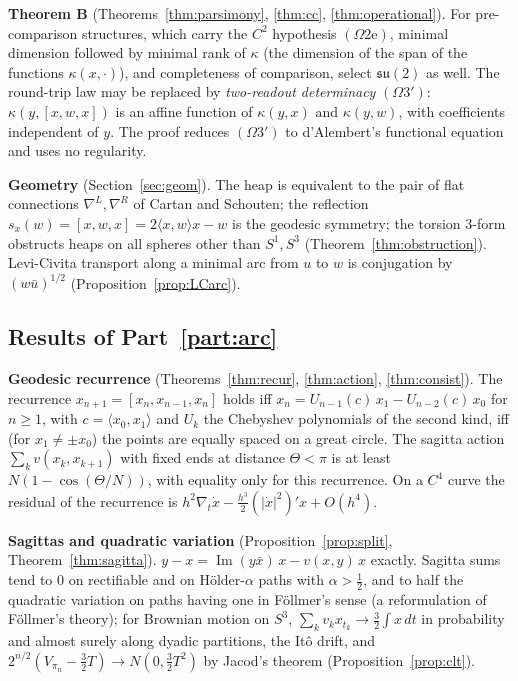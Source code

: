 \documentclass[11pt,reqno]{amsart}
\theoremstyle{definition}
\theoremstyle{remark}
\numberwithin{equation}{section}
\newcommand{\su}{\mathfrak{su}}
\newcommand{\im}{\operatorname{Im}}
\newcommand{\ip}[2]{\langle #1,#2\rangle}
\newcommand{\hp}[3]{[#1,#2,#3]}
\begin{document}
\noindent\textbf{Theorem B} (Theorems~\ref{thm:parsimony}, \ref{thm:cc}, \ref{thm:operational}).  For pre-comparison
structures, which carry the $C^2$ hypothesis $(\Omega2\mathrm e)$, minimal dimension followed by minimal rank of $\kappa$ (the
dimension of the span of the functions $\kappa(x,\cdot)$), and completeness of comparison, select $\su(2)$ as well.  The round-trip law may be
replaced by \emph{two-readout determinacy} $(\Omega3')$: $\kappa(y,\hp xwx)$ is an affine function of $\kappa(y,x)$ and
$\kappa(y,w)$, with coefficients independent of $y$.  The proof reduces $(\Omega3')$ to d'Alembert's functional equation and uses no regularity.

\noindent\textbf{Geometry} (Section~\ref{sec:geom}).  The heap is equivalent to the pair of flat
connections $\nabla^L,\nabla^R$ of Cartan and Schouten; the reflection $s_x(w)=\hp xwx=2\ip xwx-w$ is the
geodesic symmetry; the torsion $3$-form obstructs heaps on all spheres other than $S^1,S^3$
(Theorem~\ref{thm:obstruction}).  Levi-Civita transport along a minimal arc from $u$ to $w$ is conjugation
by $(w\bar u)^{1/2}$ (Proposition~\ref{prop:LCarc}).

\subsection{Results of Part~\ref{part:arc}}
\noindent\textbf{Geodesic recurrence} (Theorems~\ref{thm:recur}, \ref{thm:action}, \ref{thm:consist}).
The recurrence $x_{n+1}=\hp{x_n}{x_{n-1}}{x_n}$ holds iff
$x_n=U_{n-1}(c)\,x_1-U_{n-2}(c)\,x_0$ for $n\ge1$, with $c=\ip{x_0}{x_1}$ and $U_k$ the Chebyshev polynomials of the
second kind, iff (for $x_1\ne\pm x_0$) the points are equally spaced on a great circle.  The sagitta action
$\sum_kv(x_k,x_{k+1})$ with fixed ends at distance $\Theta<\pi$ is at least $N(1-\cos(\Theta/N))$, with
equality only for this recurrence.  On a $C^4$ curve the residual of the recurrence is
$h^2\nabla_t\dot x-\tfrac{h^3}{2}(\lvert\dot x\rvert^2)'x+O(h^4)$.

\noindent\textbf{Sagittas and quadratic variation} (Proposition~\ref{prop:split},
Theorem~\ref{thm:sagitta}).  $y-x=\im(y\bar x)\,x-v(x,y)\,x$ exactly.  Sagitta sums tend to $0$ on
rectifiable and on H\"older-$\alpha$ paths with $\alpha>\tfrac12$, and to half the quadratic variation on
paths having one in F\"ollmer's sense (a reformulation of F\"ollmer's theory); for Brownian motion on $S^3$,
$\sum_kv_kx_{t_k}\to\tfrac32\int x\,dt$ in probability and almost surely along dyadic partitions, the It\^o drift, and
$2^{n/2}(V_{\pi_n}-\tfrac32T)\to N(0,\tfrac32T^2)$ by Jacod's theorem (Proposition~\ref{prop:clt}).
\end{document}
